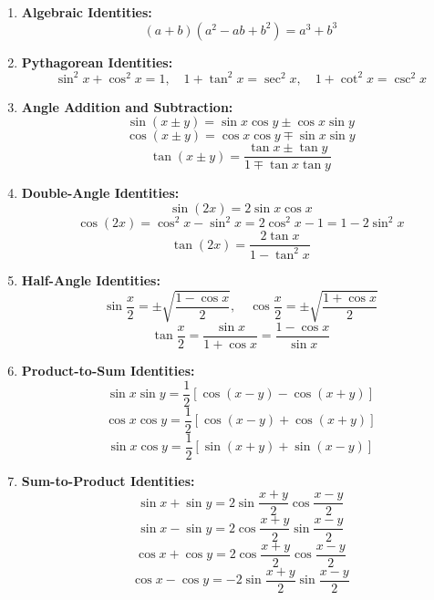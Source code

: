 \documentclass[12pt]{article}
\theoremstyle{definition} %
\theoremstyle{plain} %
\begin{document}
\begin{enumerate}
\item \textbf{Algebraic Identities:}
\[
    (a + b)(a^2 - ab + b^2) = a^3 + b^3
    \]

\item \textbf{Pythagorean Identities:}
\[
\sin^2 x + \cos^2 x = 1,\quad 1+\tan^2 x = \sec^2 x,\quad 1+\cot^2 x = \csc^2 x
\]

\item \textbf{Angle Addition and Subtraction:}
\[
\sin(x \pm y) = \sin x \cos y \pm \cos x \sin y
\]
\[
\cos(x \pm y) = \cos x \cos y \mp \sin x \sin y
\]
\[
\tan(x \pm y) = \frac{\tan x \pm \tan y}{1 \mp \tan x \tan y}
\]

\item \textbf{Double-Angle Identities:}
\[
\sin(2x) = 2 \sin x \cos x
\]
\[
\cos(2x) = \cos^2 x - \sin^2 x = 2\cos^2 x - 1 = 1 - 2\sin^2 x
\]
\[
\tan(2x) = \frac{2\tan x}{1 - \tan^2 x}
\]
\pagebreak
\item \textbf{Half-Angle Identities:}
\[
\sin\frac{x}{2} = \pm\sqrt{\frac{1 - \cos x}{2}}, \quad 
\cos\frac{x}{2} = \pm\sqrt{\frac{1 + \cos x}{2}}
\]
\[
\tan\frac{x}{2} = \frac{\sin x}{1 + \cos x} = \frac{1 - \cos x}{\sin x}
\]

\item \textbf{Product-to-Sum Identities:}
\[
\sin x \sin y = \frac{1}{2}\left[\cos(x - y) - \cos(x + y)\right]
\]
\[
\cos x \cos y = \frac{1}{2}\left[\cos(x - y) + \cos(x + y)\right]
\]
\[
\sin x \cos y = \frac{1}{2}\left[\sin(x + y) + \sin(x - y)\right]
\]

\item \textbf{Sum-to-Product Identities:}
\[
\sin x + \sin y = 2\sin\frac{x + y}{2}\cos\frac{x - y}{2}
\]
\[
\sin x - \sin y = 2\cos\frac{x + y}{2}\sin\frac{x - y}{2}
\]
\[
\cos x + \cos y = 2\cos\frac{x + y}{2}\cos\frac{x - y}{2}
\]
\[
\cos x - \cos y = -2\sin\frac{x + y}{2}\sin\frac{x - y}{2}
\]

\end{enumerate}
\end{document}

